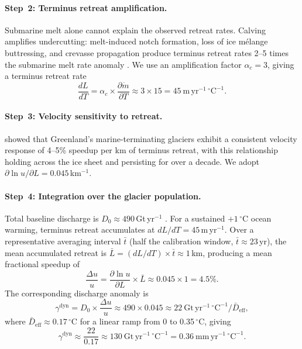 \documentclass[11pt]{article}
\begin{document}
\paragraph{Step~2: Terminus retreat amplification.}
Submarine melt alone cannot explain the observed retreat rates. Calving amplifies undercutting: melt-induced notch formation, loss of ice m\'{e}lange buttressing, and crevasse propagation produce terminus retreat rates 2--5 times the submarine melt rate anomaly \citep{Benn2007, Luckman2015}. We use an amplification factor $\alpha_c = 3$, giving a terminus retreat rate
\begin{equation}
	\frac{dL}{dT} = \alpha_c \times \frac{\partial \dot{m}}{\partial T} \approx 3 \times 15 = 45\ \mathrm{m\,yr^{-1}\,{^\circ C}^{-1}}.
\end{equation}

\paragraph{Step~3: Velocity sensitivity to retreat.}
\citet{King2020} showed that Greenland's marine-terminating glaciers exhibit a consistent velocity response of 4--5\% speedup per km of terminus retreat, with this relationship holding across the ice sheet and persisting for over a decade. We adopt $\partial \ln u / \partial L = 0.045$\,km$^{-1}$.

\paragraph{Step~4: Integration over the glacier population.}
Total baseline discharge is $D_0 \approx 490$\,Gt\,yr$^{-1}$ \citep{Mouginot2019}. For a sustained $+1\,^\circ$C ocean warming, terminus retreat accumulates at $dL/dT = 45$\,m\,yr$^{-1}$. Over a representative averaging interval $\bar{t}$ (half the calibration window, $\bar{t} \approx 23$\,yr), the mean accumulated retreat is $\bar{L} = (dL/dT) \times \bar{t} \approx 1$\,km, producing a mean fractional speedup of
\begin{equation}
	\frac{\Delta u}{u} = \frac{\partial \ln u}{\partial L} \times \bar{L} \approx 0.045 \times 1 = 4.5\%.
\end{equation}
The corresponding discharge anomaly is
\begin{equation}
	\gamma^{\mathrm{dyn}} = D_0 \times \frac{\Delta u}{u} \approx 490 \times 0.045 \approx 22\ \mathrm{Gt\,yr^{-1}\,{^\circ C}^{-1}} / \bar{D}_{\mathrm{eff}},
\end{equation}
where $\bar{D}_{\mathrm{eff}} \approx 0.17\,^\circ$C for a linear ramp from 0 to 0.35$\,^\circ$C, giving
\begin{equation}
	\gamma^{\mathrm{dyn}} \approx \frac{22}{0.17} \approx 130\ \mathrm{Gt\,yr^{-1}\,{^\circ C}^{-1}} = 0.36\ \mathrm{mm\,yr^{-1}\,{^\circ C}^{-1}}.
	\label{eq:gamma_bottomup}
\end{equation}
\end{document}
